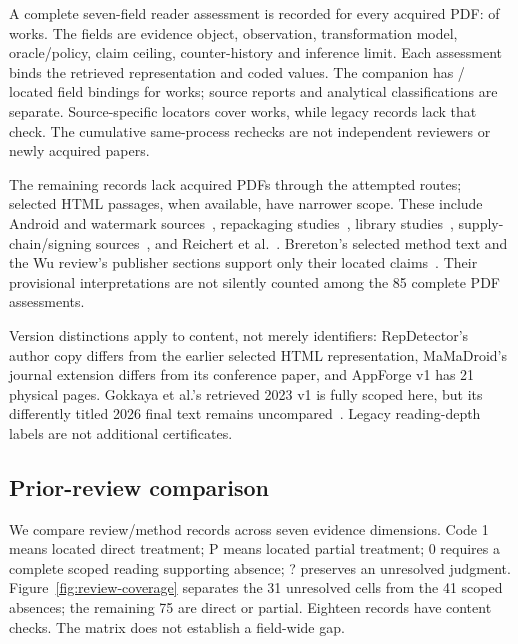 A complete seven-field reader assessment is recorded for every acquired PDF: \SemanticReadWorks{} of \CorpusWorks{} works. The fields are evidence object, observation, transformation model, oracle/policy, claim ceiling, counter-history and inference limit. Each assessment binds the retrieved representation and coded values. The companion has \LocatedCodingFields{}/\TotalCodingFields{} located field bindings for \LocatedRecodedRecords{} works; source reports and analytical classifications are separate. Source-specific locators cover \SourceCheckedWorks{} works, while \SourceUncheckedWorks{} legacy records lack that check. The \SourceRechecks{} cumulative same-process rechecks are not independent reviewers or newly acquired papers.

The remaining \WithoutLocatedCoding{} records lack acquired PDFs through the attempted routes; selected HTML passages, when available, have narrower scope. These include Android and watermark sources~\cite{sufatrio,droidmarking}, repackaging studies~\cite{repdroid,androsimilar}, library studies~\cite{libdx,libroad}, supply-chain/signing sources~\cite{ohmstuke,sigstore}, and Reichert et al.~\cite{reichert2024}. Brereton's selected method text and the Wu review's publisher sections support only their located claims~\cite{brereton,wurepack2026}. Their provisional interpretations are not silently counted among the 85 complete PDF assessments.

Version distinctions apply to content, not merely identifiers: RepDetector's author copy differs from the earlier selected HTML representation, MaMaDroid's journal extension differs from its conference paper, and AppForge v1 has 21 physical pages. Gokkaya et al.'s retrieved 2023 v1 is fully scoped here, but its differently titled 2026 final text remains uncompared~\cite{gokkaya2026}. Legacy reading-depth labels are not additional certificates.

\subsection{Prior-review comparison}

We compare \ReviewMatrixWorks{} review/method records across seven evidence dimensions. Code 1 means located direct treatment; P means located partial treatment; 0 requires a complete scoped reading supporting absence; ? preserves an unresolved judgment. Figure~\ref{fig:review-coverage} separates the 31 unresolved cells from the 41 scoped absences; the remaining 75 are direct or partial. Eighteen records have content checks. The matrix does not establish a field-wide gap.

